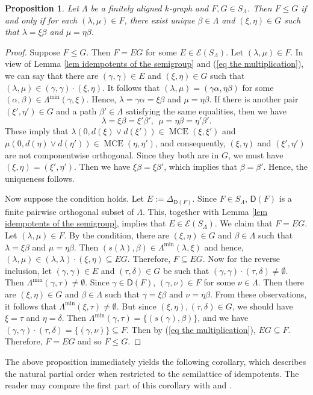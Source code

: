 \documentclass[a4paper,reqno,11pt]{amsart}
\numberwithin{equation}{section}
\newtheorem{prop}[thm]{Proposition}
\theoremstyle{definition}
\theoremstyle{remark}
\newcommand{\MCE}{\operatorname{MCE}}
\begin{document}
\begin{prop}\label{pro natural partial order on S_Lambda}
Let $\Lambda$ be a finitely aligned $k$-graph and $F,G\in S_\Lambda$. Then $F\le G$ if and only if for each $(\lambda,\mu)\in F$, there exist unique $\beta\in \Lambda$ and $(\xi,\eta)\in G$ such that $\lambda=\xi\beta$ and $\mu=\eta\beta$. 
\end{prop}
\begin{proof}
Suppose $F\le G$. Then $F=EG$ for some $E\in \mathcal{E}(S_\Lambda)$. Let $(\lambda,\mu)\in F$. In view of Lemma \ref{lem idempotents of the semigroup} and (\ref{eq the multiplication}), we can say that there are $(\gamma,\gamma)\in E$ and $(\xi,\eta)\in G$ such that $(\lambda,\mu)\in (\gamma,\gamma)\cdot (\xi,\eta)$. It follows that $(\lambda,\mu)=(\gamma\alpha,\eta\beta)$ for some $(\alpha,\beta)\in \Lambda^{\min}(\gamma,\xi)$. Hence, $\lambda=\gamma\alpha=\xi\beta$ and $\mu=\eta\beta$. If there is another pair $(\xi',\eta')\in G$ and a path $\beta'\in \Lambda$ satisfying the same equalities, then we have \[\lambda=\xi\beta=\xi'\beta',~~\mu=\eta\beta=\eta'\beta'.\] These imply that $\lambda(0,d(\xi)\vee d(\xi'))\in \MCE(\xi,\xi')$ and $\mu(0,d(\eta)\vee d(\eta'))\in \MCE(\eta,\eta')$, and consequently, $(\xi,\eta)$ and $(\xi',\eta')$ are not componentwise orthogonal. Since they both are in $G$, we must have $(\xi,\eta)=(\xi',\eta')$. Then we have $\xi\beta=\xi\beta'$, which implies that $\beta=\beta'$. Hence, the uniqueness follows. 

Now suppose the condition holds. Let $E:=\Delta_{\mathsf{D}(F)}$. Since $F\in S_\Lambda$, $\mathsf{D}(F)$ is a finite pairwise orthogonal subset of $\Lambda$. This, together with Lemma \ref{lem idempotents of the semigroup}, implies that $E\in \mathcal{E}(S_\Lambda)$. We claim that $F=EG$. Let $(\lambda,\mu)\in F$. By the condition, there are $(\xi,\eta)\in G$ and $\beta\in \Lambda$ such that $\lambda=\xi\beta$ and $\mu=\eta\beta$. Then $(s(\lambda),\beta)\in \Lambda^{\min}(\lambda,\xi)$ and hence, $(\lambda,\mu)\in (\lambda,\lambda)\cdot (\xi,\eta)\subseteq EG$. Therefore, $F\subseteq EG$. Now for the reverse inclusion, let $(\gamma,\gamma)\in E$ and $(\tau,\delta)\in G$ be such that $(\gamma,\gamma)\cdot (\tau,\delta)\neq \emptyset$. Then $\Lambda^{\min}(\gamma,\tau)\neq \emptyset$. Since $\gamma\in \mathsf{D}(F)$, $(\gamma,\nu)\in F$ for some $\nu\in \Lambda$. Then there are $(\xi,\eta)\in G$ and $\beta\in \Lambda$ such that $\gamma=\xi\beta$ and $\nu=\eta\beta$. From these observations, it follows that $\Lambda^{\min}(\xi,\tau)\neq \emptyset$. But since $(\xi,\eta),(\tau,\delta)\in G$, we should have $\xi=\tau$ and $\eta=\delta$. Then $\Lambda^{\min}(\gamma,\tau)=\{(s(\gamma),\beta)\}$, and we have $(\gamma,\gamma)\cdot (\tau,\delta)=\{(\gamma,\nu)\}\subseteq F$. Then by (\ref{eq the multiplication}), $EG\subseteq F$. Therefore, $F=EG$ and so $F\le G$.   
\end{proof}
The above proposition immediately yields the following corollary, which describes the natural partial order when restricted to the semilattice of idempotents. The reader may compare the first part of this corollary with \cite[Proposition 2.10]{Ortega} and \cite[Lemma 4.4]{Larki}.
\end{document}
